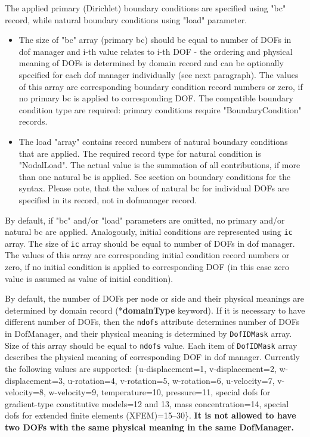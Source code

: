 \documentclass[a4paper]{article}
\newcommand{\param}[1]{\texttt{#1}} %
\newcommand{\entKeyword}[1]{*\textbf{#1}} %
\begin{document}
The applied primary (Dirichlet) boundary conditions are specified using
"bc" record, while natural boundary conditions using "load" parameter.
\begin{itemize}
\item The size of "bc" array (primary bc) should be equal to number of DOFs in dof manager and i-th value relates to i-th DOF - the ordering and physical meaning of DOFs is determined by domain record and can be optionally specified for each dof manager individually (see next paragraph). The values of this array are corresponding boundary condition record numbers or zero, if no primary bc is applied to corresponding DOF. The compatible boundary condition type are required: primary conditions require "BoundaryCondition" records.
\item The load "array" contains record numbers of natural boundary conditions that are applied. The required record type for natural condition is "NodalLoad". The actual value is the summation of all contributions, if more than one natural bc is applied. See section on boundary conditions for the syntax. Please note, that the values of natural bc for individual DOFs are specified in its record, not in dofmanager record.
\end{itemize}

By default, if "bc" and/or "load" parameters are omitted, no primary
and/or natural bc are applied. Analogously, initial conditions are represented using \param{ic} array. The size of \param{ic} array should be equal to number of DOFs in dof manager. The values of this array are corresponding initial condition record numbers or zero, if no initial condition is applied to corresponding DOF (in this case zero value is assumed as value of initial condition).

By default, the number of DOFs per node or side  and their physical meanings are determined by domain record (\entKeyword{domainType} keyword).
If it is necessary to have
different number of DOFs, then the \param{ndofs} attribute
determines number of DOFs in DofManager, and their physical meaning is
determined by \param{DofIDMask} array. Size of this array
should be equal to \param{ndofs} value. Each item of \param{DofIDMask}
array describes the physical meaning of corresponding DOF in dof manager. Currently
the following values are supported: \{u-displacement=1, v-displacement=2,
 w-displacement=3, u-rotation=4, v-ro\-ta\-tion=5, w-rotation=6, u-velocity=7, v-velocity=8, w-velocity=9,
temperature=10, pressure=11, special dofs for gradient-type constitutive models=12 and 13, mass concentration=14, special dofs for extended finite elements (XFEM)=15--30\}.
\textbf{It is not allowed to have two DOFs with the same physical meaning in the same DofManager.}
\end{document}
